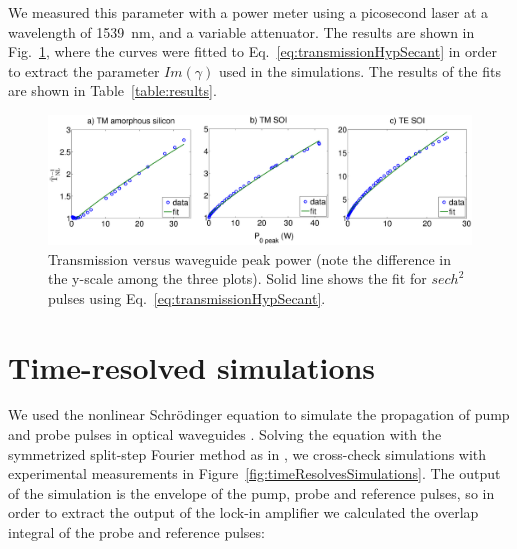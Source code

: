 \documentclass[10pt,letterpaper]{article}
\begin{document}


We measured this parameter with a power meter using a picosecond laser at a wavelength of 1539~nm, and a variable attenuator. The results are shown in Fig.~\ref{fig:imGammaSamples}, where the curves were fitted to Eq.~\ref{eq:transmissionHypSecant} in order to extract the parameter $Im(\gamma)$ used in the simulations. The results of the fits are shown in Table~\ref{table:results}.

\begin{figure}[htb]
    \centering
    \includegraphics[width=1.00\textwidth]{imGamma_aSi_TM_TE}
      \caption{Transmission versus waveguide peak power (note the difference in the y-scale among the three plots). Solid line shows the fit for $ sech^2 $ pulses using Eq.~\ref{eq:transmissionHypSecant}.}
    \label{fig:imGammaSamples}
\end{figure}


\section{Time-resolved simulations}
We used the nonlinear Schr\"{o}dinger equation to simulate the propagation of pump and probe pulses in optical waveguides \cite{Agrawal2001a}. Solving the equation with the symmetrized split-step Fourier method as in \cite{Lin2007}, we cross-check simulations with experimental measurements in Figure~\ref{fig:timeResolvesSimulations}. The output of the simulation is the envelope of the pump, probe and reference pulses, so in order to extract the output of the lock-in amplifier we calculated the overlap integral of the probe and reference pulses:
\end{document}
